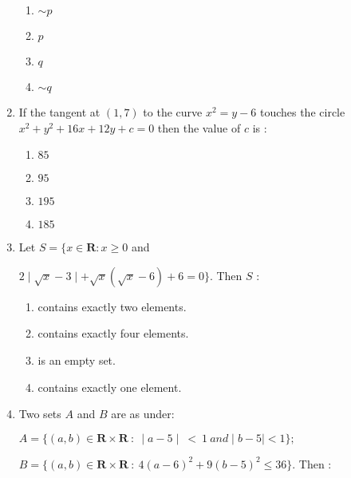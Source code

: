 \documentclass[journal,12pt,twocolumn]{IEEEtran}
\begin{document}
\begin{enumerate}[1.]
\begin{enumerate}[(1)]
\item $
\sim p
$

\item $
p
$

\item $
q
$

\item $
\sim q
$

\end{enumerate}

\item If the tangent at $(1,7)$ to the curve $x^2=y-6$ touches the circle $x^2+y^2+16x+12y+c=0$ then the value of $c$ is :

\begin{enumerate}[(1)]
 
\item $
85
$

\item $
95
$

\item $
195
$

\item $
185
$


\end{enumerate}


\item Let $S= \lbrace x \in \textbf{R} : x \geqslant 0 $ and 

$ 2 \mid \sqrt{x}-3 \mid + \sqrt{x}(\sqrt{x}-6)+6=0 \rbrace $. Then $S$ :

\begin{enumerate}[(1)]

\item contains exactly two elements.

\item contains exactly four elements.

\item is an empty set.

\item contains exactly one element.


\end{enumerate}


\item Two sets $A$ and $B$ are as under:

$A= \lbrace (a,b) \in \textbf{R} \times \textbf{R} \ : \ \mid a-5 \mid \ < \ 1 \ and \mid b-5 \mid < 1 \rbrace ; $

$B= \lbrace (a,b) \in \textbf{R} \times \textbf{R} \ : \ 4(a-6)^2+9(b-5)^2 \leq 36 \rbrace . $ Then :


\end{enumerate}
\end{document}
